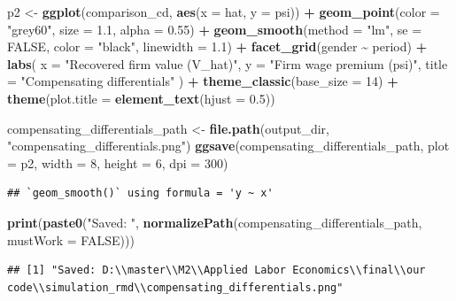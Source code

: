 \documentclass[
]{article}
\newenvironment{Shaded}{\begin{snugshade}}{\end{snugshade}}
\newcommand{\AttributeTok}[1]{\textcolor[rgb]{0.13,0.29,0.53}{#1}}
\newcommand{\ConstantTok}[1]{\textcolor[rgb]{0.56,0.35,0.01}{#1}}
\newcommand{\DecValTok}[1]{\textcolor[rgb]{0.00,0.00,0.81}{#1}}
\newcommand{\FloatTok}[1]{\textcolor[rgb]{0.00,0.00,0.81}{#1}}
\newcommand{\FunctionTok}[1]{\textcolor[rgb]{0.13,0.29,0.53}{\textbf{#1}}}
\newcommand{\NormalTok}[1]{#1}
\newcommand{\OtherTok}[1]{\textcolor[rgb]{0.56,0.35,0.01}{#1}}
\newcommand{\SpecialCharTok}[1]{\textcolor[rgb]{0.81,0.36,0.00}{\textbf{#1}}}
\newcommand{\StringTok}[1]{\textcolor[rgb]{0.31,0.60,0.02}{#1}}
\begin{document}
\begin{Shaded}
\begin{Highlighting}[]
\NormalTok{p2 }\OtherTok{\textless{}{-}} \FunctionTok{ggplot}\NormalTok{(comparison\_cd, }\FunctionTok{aes}\NormalTok{(}\AttributeTok{x =}\NormalTok{ hat, }\AttributeTok{y =}\NormalTok{ psi)) }\SpecialCharTok{+}
    \FunctionTok{geom\_point}\NormalTok{(}\AttributeTok{color =} \StringTok{"grey60"}\NormalTok{, }\AttributeTok{size =} \FloatTok{1.1}\NormalTok{, }\AttributeTok{alpha =} \FloatTok{0.55}\NormalTok{) }\SpecialCharTok{+}
    \FunctionTok{geom\_smooth}\NormalTok{(}\AttributeTok{method =} \StringTok{"lm"}\NormalTok{, }\AttributeTok{se =} \ConstantTok{FALSE}\NormalTok{, }\AttributeTok{color =} \StringTok{"black"}\NormalTok{, }\AttributeTok{linewidth =} \FloatTok{1.1}\NormalTok{) }\SpecialCharTok{+}
    \FunctionTok{facet\_grid}\NormalTok{(gender }\SpecialCharTok{\textasciitilde{}}\NormalTok{ period) }\SpecialCharTok{+}
    \FunctionTok{labs}\NormalTok{(}
        \AttributeTok{x =} \StringTok{"Recovered firm value (V\_hat)"}\NormalTok{,}
        \AttributeTok{y =} \StringTok{"Firm wage premium (psi)"}\NormalTok{,}
        \AttributeTok{title =} \StringTok{"Compensating differentials"}
\NormalTok{    ) }\SpecialCharTok{+}
    \FunctionTok{theme\_classic}\NormalTok{(}\AttributeTok{base\_size =} \DecValTok{14}\NormalTok{) }\SpecialCharTok{+}
    \FunctionTok{theme}\NormalTok{(}\AttributeTok{plot.title =} \FunctionTok{element\_text}\NormalTok{(}\AttributeTok{hjust =} \FloatTok{0.5}\NormalTok{))}

\NormalTok{compensating\_differentials\_path }\OtherTok{\textless{}{-}} \FunctionTok{file.path}\NormalTok{(output\_dir, }\StringTok{"compensating\_differentials.png"}\NormalTok{)}
\FunctionTok{ggsave}\NormalTok{(compensating\_differentials\_path, }\AttributeTok{plot =}\NormalTok{ p2, }\AttributeTok{width =} \DecValTok{8}\NormalTok{, }\AttributeTok{height =} \DecValTok{6}\NormalTok{, }\AttributeTok{dpi =} \DecValTok{300}\NormalTok{)}
\end{Highlighting}
\end{Shaded}

\begin{verbatim}
## `geom_smooth()` using formula = 'y ~ x'
\end{verbatim}

\begin{Shaded}
\begin{Highlighting}[]
\FunctionTok{print}\NormalTok{(}\FunctionTok{paste0}\NormalTok{(}\StringTok{"Saved: "}\NormalTok{, }\FunctionTok{normalizePath}\NormalTok{(compensating\_differentials\_path, }\AttributeTok{mustWork =} \ConstantTok{FALSE}\NormalTok{)))}
\end{Highlighting}
\end{Shaded}

\begin{verbatim}
## [1] "Saved: D:\\master\\M2\\Applied Labor Economics\\final\\our code\\simulation_rmd\\compensating_differentials.png"
\end{verbatim}
\end{document}
